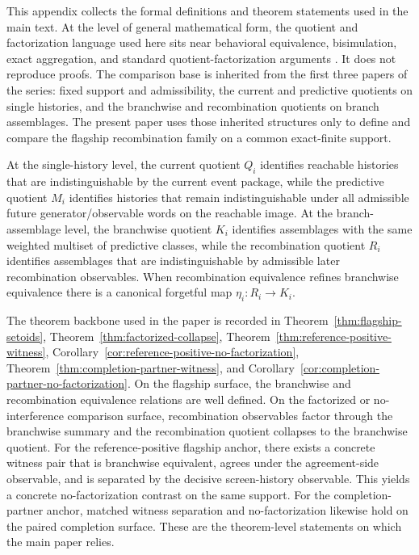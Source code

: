 \documentclass[11pt]{article}
\theoremstyle{definition}
\begin{document}
This appendix collects the formal definitions and theorem statements used in the main text. At the level of general mathematical form, the quotient and factorization language used here sits near behavioral equivalence, bisimulation, exact aggregation, and standard quotient-factorization arguments \cite{Nerode1958,Park1981,Milner1980,LarsenSkou1991,Sangiorgi2011,vanGlabbeek2001,KemenySnell1976,Buchholz1994,GivanDeanGreig2003,BurrisSankappanavar1981}. It does not reproduce proofs. The comparison base is inherited from the first three papers of the series: fixed support and admissibility, the current and predictive quotients on single histories, and the branchwise and recombination quotients on branch assemblages. The present paper uses those inherited structures only to define and compare the flagship recombination family on a common exact-finite support. \cite{Tsiokos2026LocallyBoolean,Tsiokos2026HolonomyMemory,Tsiokos2026MarkingErasureRecombination}

At the single-history level, the current quotient \(Q_i\) identifies reachable histories that are indistinguishable by the current event package, while the predictive quotient \(M_i\) identifies histories that remain indistinguishable under all admissible future generator/observable words on the reachable image. At the branch-assemblage level, the branchwise quotient \(K_i\) identifies assemblages with the same weighted multiset of predictive classes, while the recombination quotient \(R_i\) identifies assemblages that are indistinguishable by admissible later recombination observables. When recombination equivalence refines branchwise equivalence there is a canonical forgetful map \(\eta_i : R_i \to K_i\). \cite{Tsiokos2026HolonomyMemory,Tsiokos2026MarkingErasureRecombination}

The theorem backbone used in the paper is recorded in Theorem~\ref{thm:flagship-setoids}, Theorem~\ref{thm:factorized-collapse}, Theorem~\ref{thm:reference-positive-witness}, Corollary~\ref{cor:reference-positive-no-factorization}, Theorem~\ref{thm:completion-partner-witness}, and Corollary~\ref{cor:completion-partner-no-factorization}. On the flagship surface, the branchwise and recombination equivalence relations are well defined. On the factorized or no-interference comparison surface, recombination observables factor through the branchwise summary and the recombination quotient collapses to the branchwise quotient. For the reference-positive flagship anchor, there exists a concrete witness pair that is branchwise equivalent, agrees under the agreement-side observable, and is separated by the decisive screen-history observable. This yields a concrete no-factorization contrast on the same support. For the completion-partner anchor, matched witness separation and no-factorization likewise hold on the paired completion surface. These are the theorem-level statements on which the main paper relies.
\end{document}
